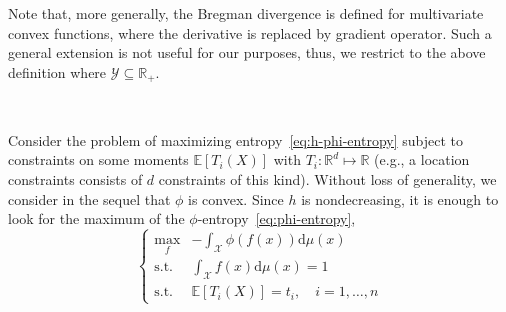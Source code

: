 \documentclass[english,sort&compress]{elsarticle}
\theoremstyle{definition}
\theoremstyle{plain}
\theoremstyle{plain}
\def\dmu{\mathrm{d}\mu}
\def\Rset{\mathbb{R}}
\def\X{\mathcal{X}}
\def\Y{\mathcal{Y}}
\newcommand{\Esp}[1]{\mathbb{E}\left[ #1 \right]}
\begin{document}
Note that,  more generally, the  Bregman divergence is defined  for multivariate
convex functions, where the derivative  is replaced by gradient operator. Such a
general extension  is not  useful for  our purposes, thus,  we restrict  to the
above definition where $\Y \subseteq \Rset_+$.

\

Consider the  problem of maximizing  entropy~\eqref{eq:h-phi-entropy} subject to
constraints  on some moments  $\Esp{T_i(X)}$ with  $T_i: \Rset^d  \mapsto \Rset$
(e.g.,   a  location   constraints  consists   of  $d$   constraints   of  this
kind). Without  loss of  generality, we  consider in the  sequel that  $\phi$ is
convex.  Since $h$ is nondecreasing, it is enough to look for the maximum of the
$\phi$-entropy~\eqref{eq:phi-entropy},
%
\begin{equation}\label{eq:MaxEnt}
\begin{cases}
\max_f & \displaystyle - \int_\X \phi(f(x)) \dmu(x)\\[5mm]
\text{s.t. } & \displaystyle \int_\X f(x) \dmu(x) = 1\\[5mm]
\text{s.t. } & \Esp{T_i(X)} = t_i, \quad i=1,\ldots,n
\end{cases}
\end{equation}
\end{document}
